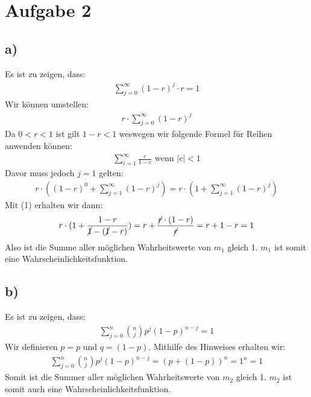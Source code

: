 \pagebreak
\section*{Aufgabe 2}
\subsection*{a)}
Es ist zu zeigen, dass:
\begin{align*}
  \sum_{j=0}^{\infty}(1-r)^j\cdot r = 1
\end{align*}
Wir können umstellen:
\begin{align*}
r\cdot \sum_{j=0}^{\infty}(1-r)^j
\end{align*}
Da $0<r<1$ ist gilt $ 1-r < 1 $ weswegen wir folgende Formel für Reihen anwenden können:
\begin{align}
  \sum_{i=1}^{\infty}\frac{ c }{ 1-c } \text{ wenn }|c| < 1
\end{align}
Davor muss jedoch $ j=1 $ gelten:
\begin{align*}
  r\cdot ((1-r)^0 + \sum_{j=1}^{\infty}(1-r)^j) = r\cdot (1+ \sum_{j=1}^{\infty}(1-r)^j) 
\end{align*}
Mit (1) erhalten wir dann:
\begin{align*}
  r\cdot (1 + \frac{ 1-r }{ \cancel{1}-(\cancel{1}-r) } ) = r + \frac{ \cancel{r}\cdot(1-r) }{ \cancel{r} } = r+1-r = 1
\end{align*}
Also ist die Summe aller möglichen Wahrheitswerte von $ m_1 $ gleich 1. $ m_1 $ ist somit eine Wahrscheinlichkeitsfunktion.
\subsection*{b)}
Es ist zu zeigen, dass:
\begin{align*}
  \sum_{j=0}^{n}\binom{n}{j}p^j(1-p)^{n-j} = 1
\end{align*}
Wir definieren $ p=p $ und $ q=(1-p) $. Mithilfe des Hinweises erhalten wir:
\begin{align*}
  \sum_{j=0}^{n}\binom{n}{j}p^j(1-p)^{n-j} = (p+(1-p))^n = 1^n = 1
\end{align*}
Somit ist die Summer aller möglichen Wahrheitswerte von $ m_2 $ gleich 1. $ m_2 $ ist somit auch eine Wahrscheinlichkeitsfunktion.